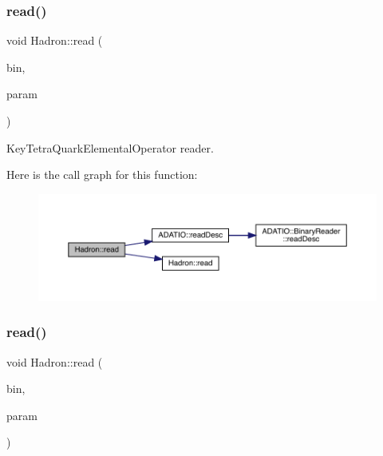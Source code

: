 \subsubsection{\texorpdfstring{read()}{read()}\hspace{0.1cm}{\footnotesize\ttfamily [41/94]}}
{\footnotesize\ttfamily void Hadron\+::read (\begin{DoxyParamCaption}\item[{\mbox{\hyperlink{classADATIO_1_1BinaryReader}{Binary\+Reader}} \&}]{bin,  }\item[{\mbox{\hyperlink{structHadron_1_1KeyTetraQuarkElementalOperator__t}{Key\+Tetra\+Quark\+Elemental\+Operator\+\_\+t}} \&}]{param }\end{DoxyParamCaption})}



Key\+Tetra\+Quark\+Elemental\+Operator reader. 

Here is the call graph for this function\+:
\nopagebreak
\begin{figure}[H]
\begin{center}
\leavevmode
\includegraphics[width=350pt]{d1/daf/namespaceHadron_a10d99bb52996f8aec8a87612e98d5684_cgraph}
\end{center}
\end{figure}
\mbox{\label{namespaceHadron_ae6acb258c409e20fdd2a36b3266138bc}} 
\subsubsection{\texorpdfstring{read()}{read()}\hspace{0.1cm}{\footnotesize\ttfamily [42/94]}}
{\footnotesize\ttfamily void Hadron\+::read (\begin{DoxyParamCaption}\item[{\mbox{\hyperlink{classADATIO_1_1BinaryReader}{Binary\+Reader}} \&}]{bin,  }\item[{\mbox{\hyperlink{structHadron_1_1KeyMesonElementalOperator__t}{Key\+Meson\+Elemental\+Operator\+\_\+t}} \&}]{param }\end{DoxyParamCaption})}



